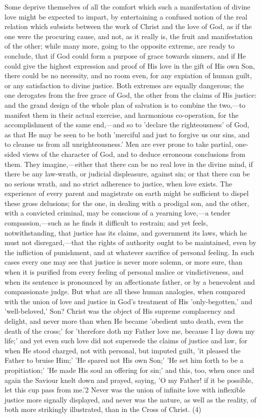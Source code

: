 \documentclass[
]{book}
\begin{document}
Some deprive themselves of all the comfort which such a manifestation of divine love might be expected to impart, by entertaining a confused notion of the real relation which subsists between the work of Christ and the love of God, as if the one were the procuring cause, and not, as it really is, the fruit and manifestation of the other; while many more, going to the opposite extreme, are ready to conclude, that if God could form a purpose of grace towards sinners, and if He could give the highest expression and proof of His love in the gift of His own Son, there could be no necessity, and no room even, for any expiation of human guilt, or any satisfaction to divine justice. Both extremes are equally dangerous; the one derogates from the free grace of God, the other from the claims of His justice: and the grand design of the whole plan of salvation is to combine the two,---to manifest them in their actual exercise, and harmonious co-operation, for the accomplishment of the same end,---and so to 'declare the righteousness' of God, as that He may be seen to be both 'merciful and just to forgive us our sins, and to cleanse us from all unrighteousness.' Men are ever prone to take partial, one-sided views of the character of God, and to deduce erroneous conclusions from them. They imagine,---either that there can be no real love in the divine mind, if there be any law-wrath, or judicial displeasure, against sin; or that there can be no serious wrath, and no strict adherence to justice, when love exists. The experience of every parent and magistrate on earth might be sufficient to dispel these gross delusions; for the one, in dealing with a prodigal son, and the other, with a convicted criminal, may be conscious of a yearning love,---a tender compassion,---such as he finds it difficult to restrain; and yet feels, notwithstanding, that justice has its claims, and government its laws, which he must not disregard,---that the rights of authority ought to be maintained, even by the infliction of punishment, and at whatever sacrifice of personal feeling. In such cases every one may see that justice is never more solemn, or more sure, than when it is purified from every feeling of personal malice or vindictiveness, and when its sentence is pronounced by an affectionate father, or by a benevolent and compassionate judge. But what are all these human analogies, when compared with the union of love and justice in God's treatment of His 'only-begotten,' and 'well-beloved,' Son? Christ was the object of His supreme complacency and delight, and never more than when He became 'obedient unto death, even the death of the cross;' for 'therefore doth my Father love me, because I lay down my life;' and yet even such love did not supersede the claims of justice and law, for when He stood charged, not with personal, but imputed guilt, 'it pleased the Father to bruise Him;' 'He spared not His own Son;' 'He set him forth to be a propitiation;' 'He made His soul an offering for sin;' and this, too, when once and again the Saviour knelt down and prayed, saying, 'O my Father! if it be possible, let this cup pass from me.'2 Never was the union of infinite love with inflexible justice more signally displayed, and never was the nature, as well as the reality, of both more strikingly illustrated, than in the Cross of Christ. (4)
\end{document}
